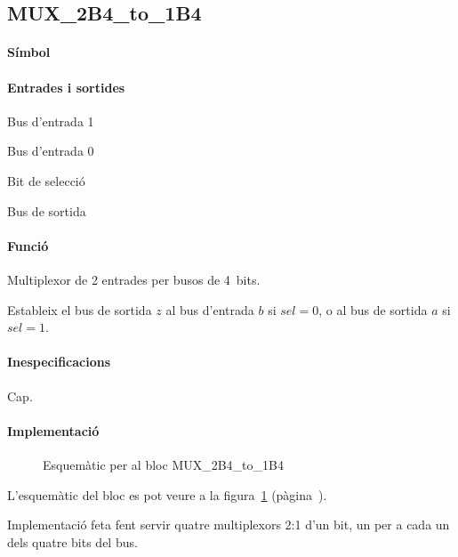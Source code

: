\subsection{\label{sub:\projectname-MUX_2B4_to_1B4} \textsf{MUX\_2B4\_to\_1B4}}

\paragraph{Símbol}
\begin{center}  \end{center}

\paragraph{Entrades i sortides}

\begin{where}
\item[\nodenamerange{a}{3}{0}] Bus d'entrada 1
\item[\nodenamerange{b}{3}{0}] Bus d'entrada 0
\item[\nodenamebit{sel}] Bit de selecció
\item[\nodenamerange{z}{3}{0}] Bus de sortida
\end{where}

\paragraph{Funció}

Multiplexor de 2 entrades per busos de 4~bits.

Estableix el bus de sortida $z$ al bus d'entrada $b$ si $sel = 0$,
o al bus de sortida $a$ si $sel = 1$.

\paragraph{Inespecificacions}

Cap.

\paragraph{Implementació}

\begin{figure}[b]
  \begin{center}
  \end{center}
  \caption{\label{fig:\projectname-MUX_2B4_to_1B4} Esquemàtic per al bloc \textsf{MUX\_2B4\_to\_1B4}}
\end{figure}

L'esquemàtic del bloc es pot veure a la figura~\ref{fig:\projectname-MUX_2B4_to_1B4} (pàgina~\pageref{fig:\projectname-MUX_2B4_to_1B4}).

Implementació feta fent servir quatre multiplexors 2:1 d'un bit,
un per a cada un dels quatre bits del bus.

\vspace{1cm}

